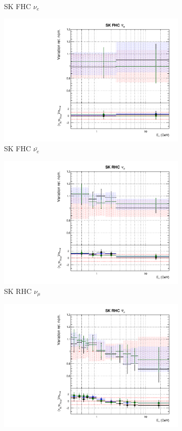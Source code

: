 \begin{figure}
\begin{subfigure}{0.24\textwidth}
  \caption{SK FHC $\nu_e$}
\end{subfigure}
\begin{subfigure}{0.24\textwidth}
  \centering
  \includegraphics[width=0.95\linewidth]{figs/fgdfitsflux_11}
  \caption{SK FHC $\bar{\nu_{e}}$}
\end{subfigure}
\begin{subfigure}{0.24\textwidth}
  \centering
  \includegraphics[width=0.95\linewidth]{figs/fgdfitsflux_12}
  \caption{SK RHC $\nu_{\mu}$}
\end{subfigure}
\begin{subfigure}{0.24\textwidth}
  \centering
  \includegraphics[width=0.95\linewidth]{figs/fgdfitsflux_13}

\end{subfigure}
\end{figure}
